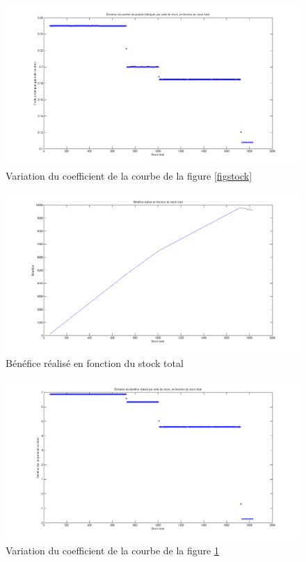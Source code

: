 \documentclass[paper=a4, fontsize=11pt]{scrartcl}
\numberwithin{equation}{section}		%
\numberwithin{figure}{section}			%
\numberwithin{table}{section}				%
\begin{document}
\begin{figure}[H]
\caption{Variation du coefficient de la courbe de la figure \ref{figstock}}
\centering
\includegraphics[width=16cm]{figures/nbProduitsFctStockTotal_Coeff.png}
\end{figure}

\begin{figure}[H]
\caption{Bénéfice réalisé en fonction du stock total \label{figben}}
\centering
\includegraphics[width=16cm]{figures/BenefFctStockTotal.png}
\end{figure}

\begin{figure}[H]
\caption{Variation du coefficient de la courbe de la figure \ref{figben}}
\centering
\includegraphics[width=16cm]{figures/BenefFctStockTotal_Coeff.png}
\end{figure}
\end{document}
